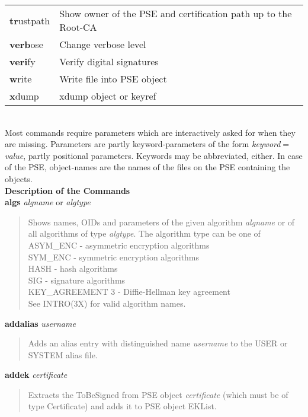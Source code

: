 \begin{tabular}{ll}
{\bf tr}ustpath    & Show owner of the PSE and certification path up to the Root-CA    \\
{\bf verb}ose      & Change verbose level                                              \\
{\bf veri}fy       & Verify digital signatures                                         \\
{\bf w}rite        & Write file into PSE object                                        \\
{\bf x}dump        & xdump object or keyref                                            \\
\end{tabular} \\ [1em]
Most commands require parameters which are interactively asked for when they are missing. 
Parameters are partly keyword-parameters of the form {\em keyword$=$value}, partly positional 
parameters. Keywords
may be abbreviated, either. In case of the PSE, object-names are the names of 
the files on the PSE containing the objects.
\\ [1em]
{\bf Description of the Commands} 
\\ [1em]
{\bf algs} {\em algname} or {\em algtype}
\begin{quote}
Shows names, OIDs and parameters of the given algorithm {\em algname} or of all algorithms
of type {\em algtype}. The algorithm type can be one of
\bvtab
\1 ASYM\_ENC \3 - asymmetric encryption algorithms \\
\1 SYM\_ENC  \3 - symmetric encryption algorithms \\
\1 HASH      \3 - hash algorithms \\
\1 SIG       \3 - signature algorithms \\
\1 KEY\_AGREEMENT   3 - Diffie-Hellman key agreement \\
\evtab
See INTRO(3X) for valid algorithm names.
\end{quote}

{\bf addalias} {\em username}
\begin{quote}
Adds an alias entry with distinguished name {\em username} to the USER or SYSTEM alias file.
\end{quote}

{\bf addek} {\em certificate}
\begin{quote}
Extracts the ToBeSigned from PSE object {\em certificate} (which must be of type Certificate)
and adds it to PSE object EKList.
\end{quote}

